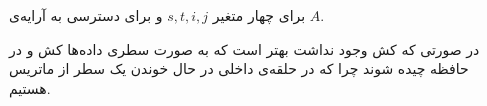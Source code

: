 
\noindent
برای
چهار متغیر
$s, t, i, j$
و برای
دسترسی به آرایه‌ی
$A$.

\noindent
در صورتی که کش وجود نداشت بهتر است که به صورت سطری داده‌ها کش و در حافظه چیده شوند چرا که در حلقه‌ی داخلی در حال خوندن
یک سطر از ماتریس هستیم.

